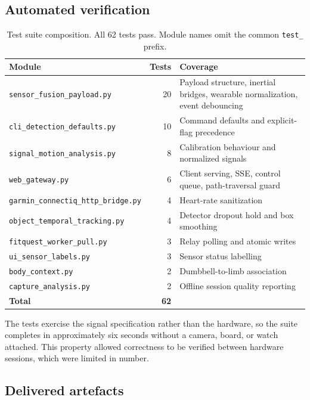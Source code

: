 \documentclass[11pt,a4paper]{article}
\newcommand{\code}[1]{\texttt{\small #1}}
\begin{document}
\subsection{Automated verification}

\begin{table}[H]
\centering
\small
\caption{Test suite composition. All 62 tests pass. Module names omit the
common \code{test\_} prefix.}
\begin{tabularx}{\textwidth}{@{}L{6.0cm} r Y@{}}
\toprule
\textbf{Module} & \textbf{Tests} & \textbf{Coverage} \\
\midrule
\code{sensor\_fusion\_payload.py} & 20 & Payload structure, inertial bridges, wearable normalization, event debouncing \\
\code{cli\_detection\_defaults.py} & 10 & Command defaults and explicit-flag precedence \\
\code{signal\_motion\_analysis.py} & 8 & Calibration behaviour and normalized signals \\
\code{web\_gateway.py} & 6 & Client serving, SSE, control queue, path-traversal guard \\
\code{garmin\_connectiq\_http\_bridge.py} & 4 & Heart-rate sanitization \\
\code{object\_temporal\_tracking.py} & 4 & Detector dropout hold and box smoothing \\
\code{fitquest\_worker\_pull.py} & 3 & Relay polling and atomic writes \\
\code{ui\_sensor\_labels.py} & 3 & Sensor status labelling \\
\code{body\_context.py} & 2 & Dumbbell-to-limb association \\
\code{capture\_analysis.py} & 2 & Offline session quality reporting \\
\midrule
\textbf{Total} & \textbf{62} & \\
\bottomrule
\end{tabularx}
\end{table}

The tests exercise the signal specification rather than the hardware, so the
suite completes in approximately six seconds without a camera, board, or watch
attached. This property allowed correctness to be verified between hardware
sessions, which were limited in number.

\subsection{Delivered artefacts}
\end{document}

